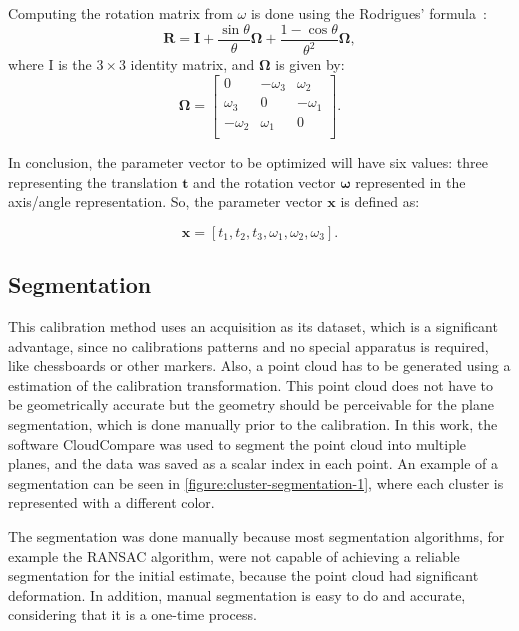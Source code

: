 \documentclass[conference]{IEEEtran}
\begin{document}
Computing the rotation matrix from $\omega$ is done using the Rodrigues' formula~\cite{schmidt01}:
%
\begin{equation}
    \textbf{R} = \bm{I} + \frac{\sin \theta}{\theta} \bm{\Omega} + \frac{1 - \cos \theta}{\theta^2} \bm{\Omega},
\end{equation}
%
\noindent
where I is the $3\times3$ identity matrix, and $\bm{\Omega}$ is given by:
%
\begin{equation}
    \bm{\Omega} = \left[
        \begin{array}{ccc}
            0  & -\omega_3 & \omega_2 \\
            \omega_3 & 0   & -\omega_1 \\
            -\omega_2 & \omega_1 & 0 \\
        \end{array}
    \right].
\end{equation}


In conclusion, the parameter vector to be optimized will have six values: three representing the translation $\bm{t}$ and the rotation vector $\bm{\omega}$ represented in the axis/angle representation. So, the parameter vector $\bm{x}$ is defined as:

\begin{equation}
    \bm{x} = \left[t_1, t_2, t_3, \omega_1, \omega_2, \omega_3\right].
\end{equation}

\subsection{Segmentation}

This calibration method uses an acquisition as its dataset, which is a significant advantage, since no calibrations patterns and no special apparatus is required, like chessboards or other markers. Also, a point cloud has to be generated using a estimation of the calibration transformation. This point cloud does not have to be geometrically accurate but the geometry should be perceivable for the plane segmentation, which is done manually prior to the calibration. In this work, the software CloudCompare was used to segment the point cloud into multiple planes, and the data was saved as a scalar index in each point. An example of a segmentation can be seen in \cref{figure:cluster-segmentation-1}, where each cluster is represented with a different color.

The segmentation was done manually because most segmentation algorithms, for example the RANSAC algorithm, were not capable of achieving a reliable segmentation for the initial estimate, because the point cloud had significant deformation. In addition, manual segmentation is easy to do and accurate, considering that it is a one-time process.
\end{document}
